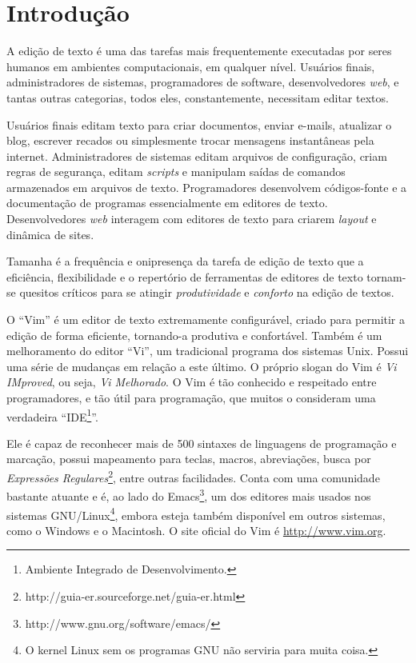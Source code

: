 
\chapter{Introdução}

A edição de texto é uma das tarefas mais frequentemente executadas por seres
humanos em ambientes computacionais, em qualquer nível. Usuários finais,
administradores de sistemas, programadores de software, desenvolvedores {\em
web}, e tantas outras categorias, todos eles, constantemente, necessitam
editar textos. 

Usuários finais editam texto para criar documentos, enviar e-mails, atualizar
o blog, escrever recados ou simplesmente trocar mensagens instantâneas pela
internet. Administradores de sistemas editam arquivos de configuração, criam
regras de segurança, editam {\em scripts} e manipulam saídas de comandos
armazenados em arquivos de texto. Programadores desenvolvem códigos-fonte e a
documentação de programas essencialmente em editores de texto.  Desenvolvedores {\em web}
interagem com editores de texto para criarem {\em layout} e dinâmica de sites.

Tamanha é a frequência e onipresença da tarefa de edição de texto que a
eficiência, flexibilidade e o repertório de ferramentas de editores de texto
tornam-se quesitos críticos para se atingir {\em produtividade} e {\em
conforto} na edição de textos.


O ``Vim'' é um editor de texto extremamente configurável, criado para
permitir a edição de forma eficiente, tornando-a produtiva e confortável. 
Também é um melhoramento do editor ``Vi'', um tradicional programa dos
sistemas Unix. Possui uma série de mudanças em relação a este último. O
próprio slogan do Vim é {\em Vi IMproved}, ou seja, {\em Vi Melhorado}.  O Vim
é tão conhecido e respeitado entre programadores, e tão útil para programação,
que muitos o consideram uma verdadeira ``IDE\footnote{Ambiente Integrado de
Desenvolvimento.}''.

Ele é capaz de reconhecer mais de 500 sintaxes de linguagens de programação e
marcação, possui mapeamento para teclas, macros, abreviações, busca por
{\em{Expressões
Regulares}}\footnote{http://guia-er.sourceforge.net/guia-er.html}, entre
outras facilidades. Conta com uma comunidade bastante atuante e é, ao lado do
Emacs\footnote{http://www.gnu.org/software/emacs/}, um dos editores mais usados
nos sistemas GNU/Linux\footnote{O kernel Linux sem os programas GNU não
serviria para muita coisa.}, embora esteja também disponível em outros sistemas,
como o Windows e o Macintosh. O site oficial do Vim é \url{http://www.vim.org}.

